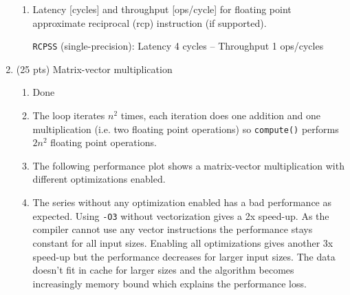 \documentclass[a4paper]{article}
\begin{document}
\begin{enumerate}
\begin{enumerate}
        \item Latency [cycles] and throughput [ops/cycle] for floating point approximate reciprocal (rcp) instruction (if supported). \par
        \verb$RCPSS$ (single-precision): Latency 4 cycles -- Throughput 1 ops/cycles \par
    \end{enumerate}
    
    \item (25 pts) Matrix-vector multiplication \par
    
    \begin{enumerate}
        \item Done
        \item The loop iterates $n^2$ times, each iteration does one addition and one multiplication (i.e. two floating point operations) so \verb$compute()$ performs $2n^2$ floating point operations.
        \newpage
        \item The following performance plot shows a matrix-vector multiplication with different optimizations enabled. 
        
        \begin{center}
        \end{center}
    
        \item The series without any optimization enabled has a bad performance as expected. Using \verb|-O3| without vectorization gives a 2x speed-up. As the compiler cannot use any vector instructions the performance stays constant for all input sizes. Enabling all optimizations gives another 3x speed-up but the performance decreases for larger input sizes. The data doesn't fit in cache for larger sizes and the algorithm becomes increasingly memory bound which explains the performance loss.
        

\end{enumerate}
\end{enumerate}
\end{document}
